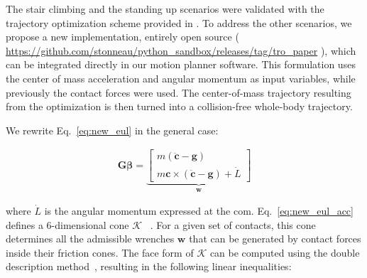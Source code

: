 \documentclass[journal]{IEEEtran}
\newcommand{\mat}[1]{\ensuremath{\begin{bmatrix}#1\end{bmatrix}}}	%
\newcommand{\deladp}[1]{\deleted[id=adp]{#1}}
\providecommand{\DIFaddbegin}{\protect\color{blue}} %
\providecommand{\DIFaddend}{\protect\color{black}} %
\providecommand{\DIFdelbegin}{\protect\cbdelete} %
\providecommand{\DIFdelend}{} %
\begin{document}
\DIFdelbegin %
\label{app:optim}
The stair climbing and the standing up scenarios were validated with the trajectory optimization scheme provided in \citeauthor{Carpentier2016}. 
To address the other scenarios, we propose a new implementation, entirely open source (\DIFdelbegin %
\DIFdelend \DIFaddbegin \url{https://github.com/stonneau/python_sandbox/releases/tag/tro_paper} \DIFaddend ), which can be integrated directly in our motion planner software. This formulation uses the center of mass acceleration and angular momentum as input variables, while previously the contact forces were used.
The center-of-mass trajectory resulting from the optimization is then turned into a collision-free whole-body trajectory.

We rewrite Eq.~\ref{eq:new_eul} in the general case:


\begin{align} \label{eq:new_eul_acc}
\mathbf{G} \bm{\beta} = 
\underbrace{\mat{m (\mathbf{\ddot{c}} - \mathbf{g}) \\m \mathbf{c} \times (\mathbf{\ddot{c}} - \mathbf{g}) + \dot{L}}}_{\mathbf{w}}
\end{align}

\DIFaddbegin \noindent \DIFaddend where $\dot{L}$ is the angular momentum expressed at the com.
Eq.~\ref{eq:new_eul_acc} defines a 6-dimensional cone $\mathcal{K}$ ~\citep{qiu:dhm:2011,Caron2015}. For a given set of contacts,
this cone determines all the admissible wrenches $\mathbf{w}$ that can be generated by contact forces inside their friction cones.
The face form of $\mathcal{K}$ can be computed using the double description method~\citep{Fukuda1996}, resulting in the following linear inequalities:
\end{document}
